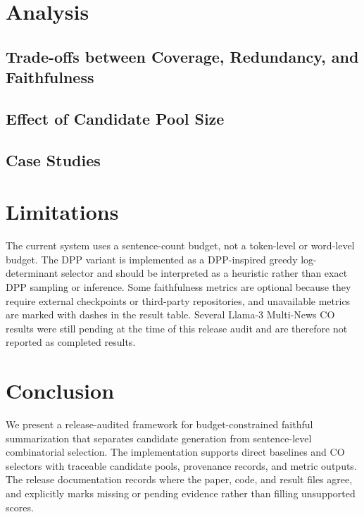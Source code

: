 \documentclass[11pt]{article}
\begin{document}
\section{Analysis}
\subsection{Trade-offs between Coverage, Redundancy, and Faithfulness}
\subsection{Effect of Candidate Pool Size}
\subsection{Case Studies}

\section{Limitations}
The current system uses a sentence-count budget, not a token-level or word-level budget. The DPP variant is implemented as a DPP-inspired greedy log-determinant selector and should be interpreted as a heuristic rather than exact DPP sampling or inference. Some faithfulness metrics are optional because they require external checkpoints or third-party repositories, and unavailable metrics are marked with dashes in the result table. Several Llama-3 Multi-News CO results were still pending at the time of this release audit and are therefore not reported as completed results.

\section{Conclusion}
We present a release-audited framework for budget-constrained faithful summarization that separates candidate generation from sentence-level combinatorial selection. The implementation supports direct baselines and CO selectors with traceable candidate pools, provenance records, and metric outputs. The release documentation records where the paper, code, and result files agree, and explicitly marks missing or pending evidence rather than filling unsupported scores.



\end{document}
